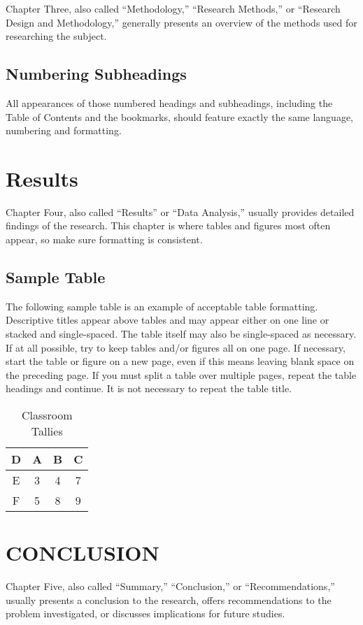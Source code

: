 \documentclass{UCF_ETD}
\begin{document}
Chapter Three, also called “Methodology,” “Research Methods,” or “Research Design and Methodology,” generally presents an overview of the methods used for researching the subject.

\section{Numbering Subheadings}
All appearances of those numbered headings and subheadings, including the Table of Contents and the bookmarks, should feature exactly the same language, numbering and formatting.

\chapter{Results}
Chapter Four, also called ``Results'' or ``Data Analysis,'' usually provides detailed findings of the research.  This chapter is where tables and figures most often appear, so make sure formatting is consistent.

\section{Sample Table}
The following sample table is an example of acceptable table formatting. Descriptive titles appear above tables and may appear either on one line or stacked and single-spaced. The table itself may also be single-spaced as necessary. If at all possible, try to keep tables and/or figures all on one page. If necessary, start the table or figure on a new page, even if this means leaving blank space on the preceding page. If you must split a table over multiple pages, repeat the table headings and continue. It is not necessary to repeat the table title.


\begin{table}[h]
\centering
\caption{Classroom Tallies}
\begin{tabular}{ |c|c|c|c|}
\hline
D & A & B & C\\
\hline
E &  3  & 4 & 7\\
\hline
F  &  5   & 8 & 9\\
\hline
\end{tabular}
\end{table}


\chapter{CONCLUSION}
Chapter Five, also called ``Summary,'' ``Conclusion,'' or ``Recommendations,'' usually presents a conclusion to the research, offers recommendations to the problem investigated, or discusses implications for future studies.
\end{document}

